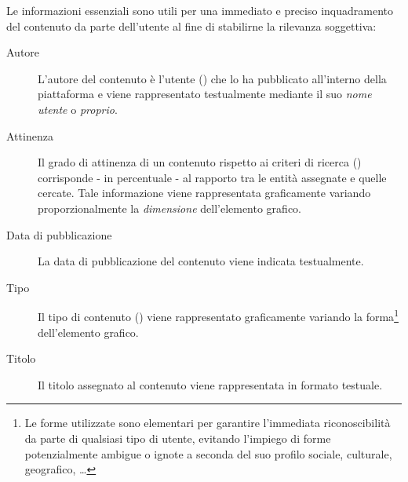 \documentclass[10pt,a4paper,headinclude,footinclude,hidelinks]{scrreprt} %
\begin{document}
	Le informazioni essenziali sono utili per una immediato e preciso inquadramento del contenuto da parte dell'utente al fine di stabilirne la rilevanza soggettiva:
	\begin{description}
	\item[Autore] L'autore del contenuto è l'utente (\textit{}) che lo ha pubblicato all'interno della piattaforma e viene rappresentato testualmente mediante il suo \textit{nome utente} o \textit{proprio}.
	\item[Attinenza] Il grado di attinenza di un contenuto rispetto ai criteri di ricerca (\textit{}) corrisponde - in percentuale - al rapporto tra le entità assegnate e quelle cercate. Tale informazione viene rappresentata graficamente variando proporzionalmente la \textit{dimensione} dell'elemento grafico.
	\item[Data di pubblicazione] La data di pubblicazione del contenuto viene indicata testualmente.
	\item[Tipo] Il tipo di contenuto (\textit{}) viene rappresentato graficamente variando la forma\footnote{Le forme utilizzate sono elementari per garantire l'immediata riconoscibilità da parte di qualsiasi tipo di utente, evitando l'impiego di forme potenzialmente ambigue o ignote a seconda del suo profilo sociale, culturale, geografico, \ldots} dell'elemento grafico.
	\item[Titolo] Il titolo assegnato al contenuto viene rappresentata in formato testuale.
	\end{description}
\end{document}
